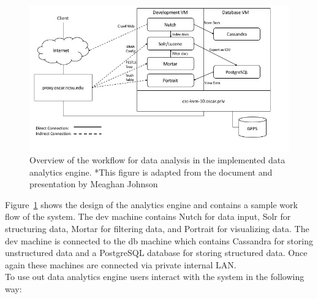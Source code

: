 \begin{figure}[H]
  \centering
  \includegraphics[scale=0.60]{img/design-workflow}
  \caption{Overview of the workflow for data analysis in the
    implemented data analytics engine. *This figure is adapted
    from the document and presentation by Meaghan Johnson}
  \label{fig:design-workflow}
\end{figure}

Figure~\ref{fig:design-workflow} shows the design of the analytics
engine and contains a sample work flow of the system. The dev machine
contains Nutch for data input, Solr for structuring data, Mortar for
filtering data, and Portrait for visualizing data. The dev machine is
connected to the db machine which contains Cassandra for storing
unstructured data and a PostgreSQL database for storing structured data.
Once again these machines are connected via private internal LAN.\\

 To use out data analytics engine users
interact with the system in the following way:

